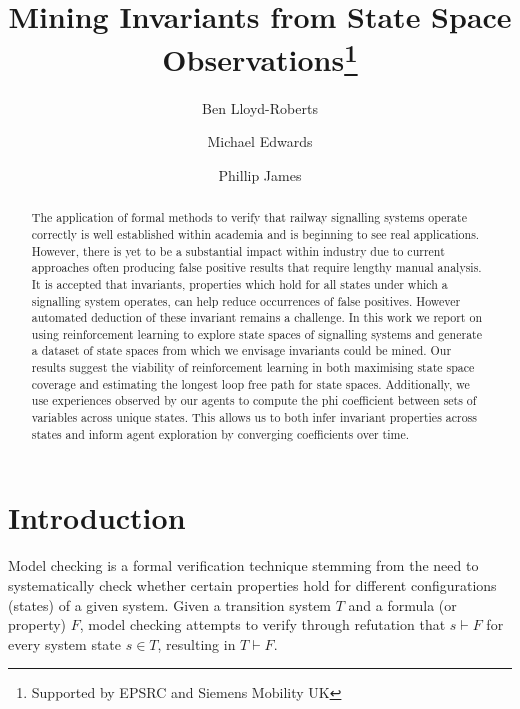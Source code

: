 \documentclass[runningheads]{llncs}
\begin{document}
%
\title{Mining Invariants from State Space Observations\thanks{Supported by EPSRC and Siemens Mobility UK}}
%
%
\author{Ben Lloyd-Roberts \and
Michael Edwards \and {Phillip James}}
%
%
%
\maketitle              %
%
\begin{abstract}
The application of formal methods to verify that railway signalling systems operate correctly is well established within academia and is beginning to see real applications. However, there is yet to be a substantial impact within industry due to current approaches often producing false positive results that require lengthy manual analysis. It is accepted that invariants, properties which hold for all states under which a signalling system operates, can help reduce occurrences of false positives. However automated deduction of these invariant remains a challenge. In this work we report on using reinforcement learning to explore state spaces of signalling systems and generate a dataset of state spaces from which we envisage invariants could be mined. Our results suggest the viability of reinforcement learning in both maximising state space coverage and estimating the longest loop free path for state spaces. Additionally, we use experiences observed by our agents to compute the phi coefficient between sets of variables across unique states. This allows us to both infer invariant properties across states and inform agent exploration by converging coefficients over time.

\end{abstract}
%
%
%
\section{Introduction}
Model checking is a formal verification technique stemming from the need to systematically
check whether certain properties hold for different configurations (states) of a given system.
Given a transition system $T$ and a formula (or property) $F$, model checking attempts to verify through refutation that $s \vdash F$ for every system state $s \in T$, resulting in $T \vdash F$. 
\end{document}
